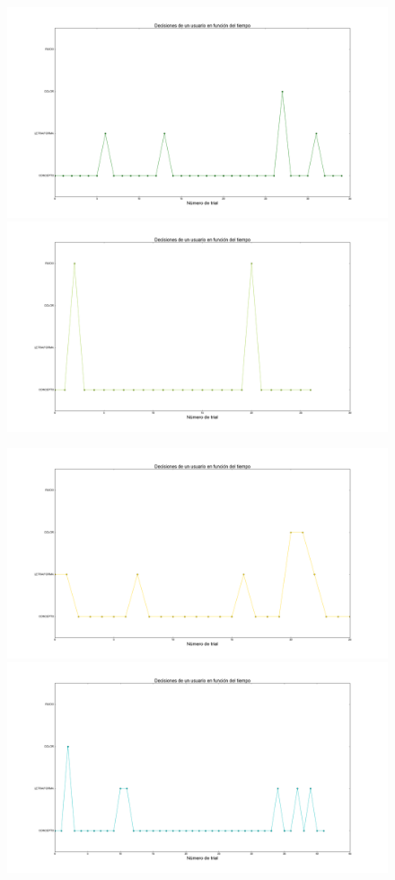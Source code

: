 \documentclass{beamer}
\begin{document}
\begin{frame}
\begin{figure}[h]
 \centering
  \begin{minipage}[c]{1\textwidth}
	\includegraphics[scale=0.11]{user2.png}
	\includegraphics[scale=0.11]{user12.png}
  \end{minipage}
  \begin{minipage}[c]{1\textwidth}
	\includegraphics[scale=0.11]{user4.png}
	\includegraphics[scale=0.11]{user5.png}

\end{minipage}
\end{figure}
\end{frame}
\end{document}
